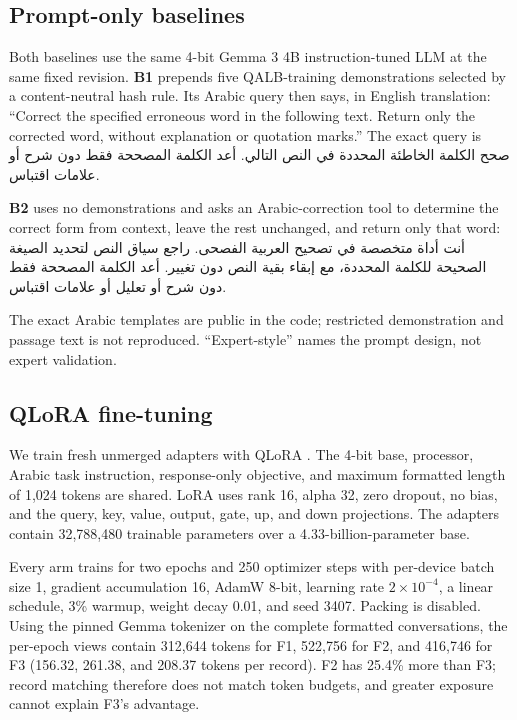 \documentclass[11pt,a4paper]{article}
\newcommand{\textarabic}[1]{{\arabicfont\beginR#1\endR}}
\begin{document}
\subsection{Prompt-only baselines}

Both baselines use the same 4-bit Gemma 3 4B instruction-tuned LLM at the same
fixed revision.  \textbf{B1} prepends five QALB-training demonstrations
selected by a content-neutral hash rule.  Its Arabic query then says, in
English translation: ``Correct the specified erroneous word in the following
text. Return only the corrected word, without explanation or quotation
marks.''  The exact query is \textarabic{صحح الكلمة الخاطئة المحددة في النص
التالي. أعد الكلمة المصححة فقط دون شرح أو علامات اقتباس.}

\noindent\textbf{B2} uses no
demonstrations and asks an Arabic-correction tool
to determine the correct form from context, leave the rest unchanged, and
return only that word: \textarabic{أنت أداة متخصصة في تصحيح العربية الفصحى.
راجع سياق النص لتحديد الصيغة الصحيحة للكلمة المحددة، مع إبقاء بقية النص دون
تغيير. أعد الكلمة المصححة فقط دون شرح أو تعليل أو علامات اقتباس.}

The exact Arabic templates are public in the code;
restricted demonstration and passage text is not reproduced.  ``Expert-style''
names the prompt design, not expert validation.

\subsection{QLoRA fine-tuning}

We train fresh unmerged adapters with QLoRA
\citep{dettmers-etal-2023-qlora}.  The 4-bit base, processor, Arabic task
instruction, response-only objective, and maximum formatted length of 1,024
tokens are shared.  LoRA uses rank 16, alpha 32, zero dropout, no bias, and the
query, key, value, output, gate, up, and down projections.  The adapters contain
32,788,480 trainable parameters over a 4.33-billion-parameter base.

Every arm trains for two epochs and 250 optimizer steps with per-device batch
size 1, gradient accumulation 16, AdamW 8-bit, learning rate
$2\times10^{-4}$, a linear schedule, 3\% warmup, weight decay 0.01, and seed
3407.  Packing is disabled.
Using the pinned Gemma tokenizer on the complete formatted conversations, the
per-epoch views contain 312,644 tokens for F1, 522,756 for F2, and 416,746 for
F3 (156.32, 261.38, and 208.37 tokens per record).  F2 has 25.4\% more than
F3; record matching therefore does not match token budgets, and greater
exposure cannot explain F3's advantage.
\end{document}
